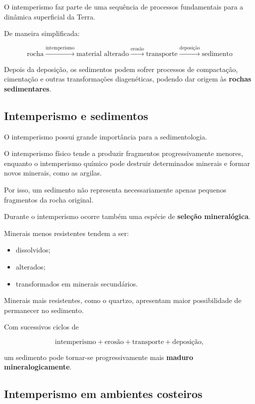 O intemperismo faz parte de uma sequência de processos fundamentais para a dinâmica superficial da Terra.

De maneira simplificada:

\[
\boxed{
\text{rocha}
\xrightarrow{\text{intemperismo}}
\text{material alterado}
\xrightarrow{\text{erosão}}
\text{transporte}
\xrightarrow{\text{deposição}}
\text{sedimento}
}
\]

Depois da deposição, os sedimentos podem sofrer processos de compactação, cimentação e outras transformações diagenéticas, podendo dar origem às \textbf{rochas sedimentares}.

\subsection{Intemperismo e sedimentos}

O intemperismo possui grande importância para a sedimentologia.

O intemperismo físico tende a produzir fragmentos progressivamente menores, enquanto o intemperismo químico pode destruir determinados minerais e formar novos minerais, como as argilas.

Por isso, um sedimento não representa necessariamente apenas pequenos fragmentos da rocha original.

Durante o intemperismo ocorre também uma espécie de \textbf{seleção mineralógica}.

Minerais menos resistentes tendem a ser:

\begin{itemize}
    \item dissolvidos;
    \item alterados;
    \item transformados em minerais secundários.
\end{itemize}

Minerais mais resistentes, como o quartzo, apresentam maior possibilidade de permanecer no sedimento.

Com sucessivos ciclos de

\[
\text{intemperismo}
+
\text{erosão}
+
\text{transporte}
+
\text{deposição},
\]

um sedimento pode tornar-se progressivamente mais \textbf{maduro mineralogicamente}.

\subsection{Intemperismo em ambientes costeiros}

